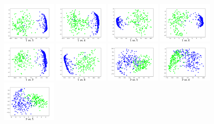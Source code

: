 \includegraphics[height=2cm]{./figs/1vs3.png}
\includegraphics[height=2cm]{./figs/1vs4.png}
\includegraphics[height=2cm]{./figs/1vs5.png}
\includegraphics[height=2cm]{./figs/1vs6.png}
\includegraphics[height=2cm]{./figs/1vs7.png}
\includegraphics[height=2cm]{./figs/1vs8.png}
\includegraphics[height=2cm]{./figs/2vs3.png}
\includegraphics[height=2cm]{./figs/2vs4.png}
\includegraphics[height=2cm]{./figs/2vs5.png}
